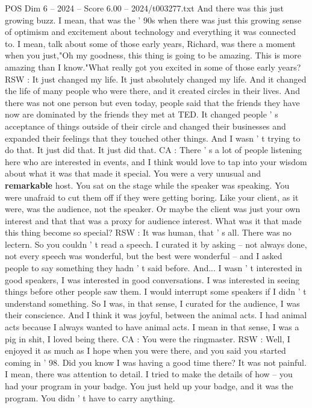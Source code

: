 \begin{textsample}{POS Dim 6 – 2024 – Score 6.00 – 2024/t003277.txt}
And there was this just growing buzz.
I mean, that was the ' 90s when there was just this growing sense of optimism and excitement about technology and everything it was connected to.
I mean, talk about some of those early years, Richard, was there a moment when you just,"Oh my goodness, this thing is going to be amazing.
This is more amazing than I know."What really got you excited in some of those early years?
RSW : It just changed my life.
It just absolutely changed my life.
And it changed the life of many people who were there, and it created circles in their lives.
And there was not one person but even today, people said that the friends they have now are dominated by the friends they met at TED.
It changed people ' s acceptance of things outside of their circle and changed their businesses and expanded their feelings that they touched other things.
And I wasn ' t trying to do that.
It just did that.
It just did that.
CA : There ' s a lot of people listening here who are interested in events, and I think would love to tap into your wisdom about what it was that made it special.
You were a very unusual and \textbf{remarkable} host.
You sat on the stage while the speaker was speaking.
You were unafraid to cut them off if they were getting boring.
Like your client, as it were, was the audience, not the speaker.
Or maybe the client was just your own interest and that that was a proxy for audience interest.
What was it that made this thing become so special?
RSW : It was human, that ' s all.
There was no lectern.
So you couldn ' t read a speech.
I curated it by asking -- not always done, not every speech was wonderful, but the best were wonderful -- and I asked people to say something they hadn ' t said before.
And...
I wasn ' t interested in good speakers, I was interested in good conversations.
I was interested in seeing things before other people saw them.
I would interrupt some speakers if I didn ' t understand something.
So I was, in that sense, I curated for the audience, I was their conscience.
And I think it was joyful, between the animal acts.
I had animal acts because I always wanted to have animal acts.
I mean in that sense, I was a pig in shit, I loved being there.
CA : You were the ringmaster.
RSW : Well, I enjoyed it as much as I hope when you were there, and you said you started coming in ' 98.
Did you know I was having a good time there?
It was not painful.
I mean, there was attention to detail.
I tried to make the details of how -- you had your program in your badge.
You just held up your badge, and it was the program.
You didn ' t have to carry anything.

\end{textsample}
